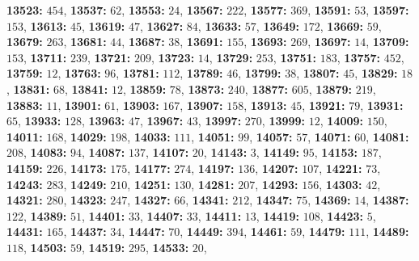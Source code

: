 \textsf{\bfseries 13523:} $454$, \textsf{\bfseries 13537:} $62$, \textsf{\bfseries 13553:} $24$, \textsf{\bfseries 13567:} $222$, \textsf{\bfseries 13577:} $369$, \textsf{\bfseries 13591:} $53$, \textsf{\bfseries 13597:} $153$, \textsf{\bfseries 13613:} $45$, \textsf{\bfseries 13619:} $47$, \textsf{\bfseries 13627:} $84$, \textsf{\bfseries 13633:} $57$, \textsf{\bfseries 13649:} $172$, \textsf{\bfseries 13669:} $59$, \textsf{\bfseries 13679:} $263$, \textsf{\bfseries 13681:} $44$, \textsf{\bfseries 13687:} $38$, \textsf{\bfseries 13691:} $155$, \textsf{\bfseries 13693:} $269$, \textsf{\bfseries 13697:} $14$, \textsf{\bfseries 13709:} $153$, \textsf{\bfseries 13711:} $239$, \textsf{\bfseries 13721:} $209$, \textsf{\bfseries 13723:} $14$, \textsf{\bfseries 13729:} $253$, \textsf{\bfseries 13751:} $183$, \textsf{\bfseries 13757:} $452$, \textsf{\bfseries 13759:} $12$, \textsf{\bfseries 13763:} $96$, \textsf{\bfseries 13781:} $112$, \textsf{\bfseries 13789:} $46$, \textsf{\bfseries 13799:} $38$, \textsf{\bfseries 13807:} $45$, \textsf{\bfseries 13829:} $18$, \textsf{\bfseries 13831:} $68$, \textsf{\bfseries 13841:} $12$, \textsf{\bfseries 13859:} $78$, \textsf{\bfseries 13873:} $240$, \textsf{\bfseries 13877:} $605$, \textsf{\bfseries 13879:} $219$, \textsf{\bfseries 13883:} $11$, \textsf{\bfseries 13901:} $61$, \textsf{\bfseries 13903:} $167$, \textsf{\bfseries 13907:} $158$, \textsf{\bfseries 13913:} $45$, \textsf{\bfseries 13921:} $79$, \textsf{\bfseries 13931:} $65$, \textsf{\bfseries 13933:} $128$, \textsf{\bfseries 13963:} $47$, \textsf{\bfseries 13967:} $43$, \textsf{\bfseries 13997:} $270$, \textsf{\bfseries 13999:} $12$, \textsf{\bfseries 14009:} $150$, \textsf{\bfseries 14011:} $168$, \textsf{\bfseries 14029:} $198$, \textsf{\bfseries 14033:} $111$, \textsf{\bfseries 14051:} $99$, \textsf{\bfseries 14057:} $57$, \textsf{\bfseries 14071:} $60$, \textsf{\bfseries 14081:} $208$, \textsf{\bfseries 14083:} $94$, \textsf{\bfseries 14087:} $137$, \textsf{\bfseries 14107:} $20$, \textsf{\bfseries 14143:} $3$, \textsf{\bfseries 14149:} $95$, \textsf{\bfseries 14153:} $187$, \textsf{\bfseries 14159:} $226$, \textsf{\bfseries 14173:} $175$, \textsf{\bfseries 14177:} $274$, \textsf{\bfseries 14197:} $136$, \textsf{\bfseries 14207:} $107$, \textsf{\bfseries 14221:} $73$, \textsf{\bfseries 14243:} $283$, \textsf{\bfseries 14249:} $210$, \textsf{\bfseries 14251:} $130$, \textsf{\bfseries 14281:} $207$, \textsf{\bfseries 14293:} $156$, \textsf{\bfseries 14303:} $42$, \textsf{\bfseries 14321:} $280$, \textsf{\bfseries 14323:} $247$, \textsf{\bfseries 14327:} $66$, \textsf{\bfseries 14341:} $212$, \textsf{\bfseries 14347:} $75$, \textsf{\bfseries 14369:} $14$, \textsf{\bfseries 14387:} $122$, \textsf{\bfseries 14389:} $51$, \textsf{\bfseries 14401:} $33$, \textsf{\bfseries 14407:} $33$, \textsf{\bfseries 14411:} $13$, \textsf{\bfseries 14419:} $108$, \textsf{\bfseries 14423:} $5$, \textsf{\bfseries 14431:} $165$, \textsf{\bfseries 14437:} $34$, \textsf{\bfseries 14447:} $70$, \textsf{\bfseries 14449:} $394$, \textsf{\bfseries 14461:} $59$, \textsf{\bfseries 14479:} $111$, \textsf{\bfseries 14489:} $118$, \textsf{\bfseries 14503:} $59$, \textsf{\bfseries 14519:} $295$, \textsf{\bfseries 14533:} $20$, 

